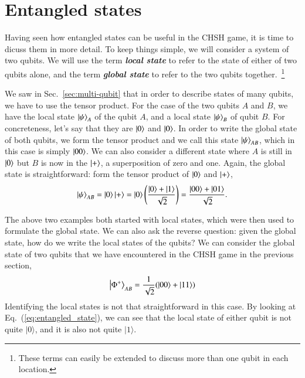 \section{Entangled states}
\label{sec:4_2-entagnled_states}

Having seen how entangled states can be useful in the CHSH game, it is time to dicuss them in more detail.
To keep things simple, we will consider a system of two qubits.
We will use the term \textbf{\emph{local state}} to refer to the state of either of two qubits alone, and the term \textbf{\emph{global state}} to refer to the two qubits together.~\footnote{These terms can easily be extended to discuss more than one qubit in each location.}

We saw in Sec.~\ref{sec:multi-qubit} that in order to describe states of many qubits, we have to use the tensor product. For the case of the two qubits $A$ and $B$, we have the local state $\left| \psi \right\rangle_A$ of the qubit $A$, and a local state $\left| \psi \right\rangle_B$ of qubit $B$.
For concreteness, let's say that they are $\left| 0 \right\rangle$ and $\left| 0 \right\rangle$.
In order to write the global state of both qubits, we form the tensor product and we call this state $\left| \psi \right\rangle_{AB}$, which in this case is simply $\left| 00 \right\rangle$.
We can also consider a different state where $A$ is still in $\left| 0 \right\rangle$ but $B$ is now in the $\left| + \right\rangle$, a superposition of zero and one.
Again, the global state is straightforward: form the tensor product of $\left| 0 \right\rangle$ and $\left| + \right\rangle$,
\begin{equation}
\left| \psi \right\rangle_{AB} = \left| 0 \right\rangle\left| + \right\rangle = \left| 0 \right\rangle\left(\frac{\left| 0 \right\rangle + \left| 1 \right\rangle}{\sqrt{2}}\right) = \frac{\left| 00 \right\rangle + \left| 01 \right\rangle}{\sqrt2}.
\end{equation}

The above two examples both started with local states, which were then used to formulate the global state.
We can also ask the reverse question: given the global state, how do we write the local states of the qubits?
We can consider the global state of two qubits that we have encountered in the CHSH game in the previous section,
\begin{equation}
    \ket{\Phi^+}_{AB} = \frac{1}{\sqrt2}(\ket{00} + \ket{11})
    \label{eq:entangled_state}
\end{equation}
Identifying the local states is not that straightforward in this case.
By looking at Eq.~(\ref{eq:entangled_state}), we can see that the local state of either qubit is not quite $|0\rangle$, and it is also not quite $|1\rangle$.

